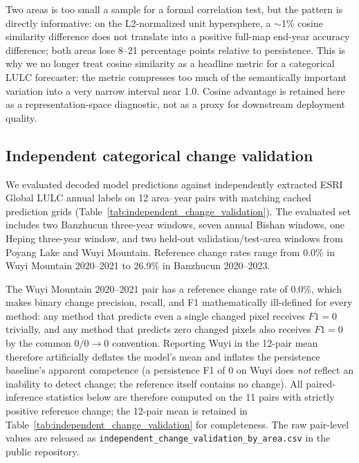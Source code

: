 \documentclass{article}
\begin{document}
Two areas is too small a sample for a formal correlation test, but the pattern is directly informative: on the L2-normalized unit hypersphere, a $\sim$1\% cosine similarity difference does not translate into a positive full-map end-year accuracy difference; both areas lose 8--21 percentage points relative to persistence. This is why we no longer treat cosine similarity as a headline metric for a categorical LULC forecaster: the metric compresses too much of the semantically important variation into a very narrow interval near 1.0. Cosine advantage is retained here as a representation-space diagnostic, not as a proxy for downstream deployment quality.

\subsection{Independent categorical change validation}
\label{sec:independent_change_validation}

We evaluated decoded model predictions against independently extracted ESRI Global LULC annual labels on 12 area--year pairs with matching cached prediction grids (Table~\ref{tab:independent_change_validation}). The evaluated set includes two Banzhucun three-year windows, seven annual Bishan windows, one Heping three-year window, and two held-out validation/test-area windows from Poyang Lake and Wuyi Mountain. Reference change rates range from 0.0\% in Wuyi Mountain 2020--2021 to 26.9\% in Banzhucun 2020--2023.

The Wuyi Mountain 2020--2021 pair has a reference change rate of 0.0\%, which makes binary change precision, recall, and F1 mathematically ill-defined for every method: any method that predicts even a single changed pixel receives $F1=0$ trivially, and any method that predicts zero changed pixels also receives $F1=0$ by the common $0/0 \to 0$ convention. Reporting Wuyi in the 12-pair mean therefore artificially deflates the model's mean and inflates the persistence baseline's apparent competence (a persistence F1 of $0$ on Wuyi does \emph{not} reflect an inability to detect change; the reference itself contains no change). All paired-inference statistics below are therefore computed on the 11 pairs with strictly positive reference change; the 12-pair mean is retained in Table~\ref{tab:independent_change_validation} for completeness. The raw pair-level values are released as \texttt{independent\_change\_validation\_by\_area.csv} in the public repository.
\end{document}
